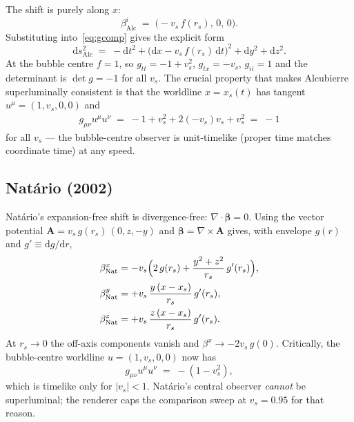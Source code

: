 \documentclass[11pt]{article}
\newcommand{\diff}{\mathrm{d}}
\begin{document}
The shift is purely along $x$:
\begin{equation}
\beta^i_{\text{Alc}} \;=\; \bigl(-v_s\,f(r_s),\,0,\,0\bigr).
\label{eq:alc-shift}
\end{equation}
Substituting into~\eqref{eq:gcomp} gives the explicit form
\begin{equation}
\diff s^2_{\text{Alc}} \;=\; -\diff t^2 + \bigl(\diff x - v_s\,f(r_s)\,\diff t\bigr)^2 + \diff y^2 + \diff z^2.
\label{eq:alc-line}
\end{equation}
At the bubble centre $f=1$, so $g_{tt}=-1+v_s^2$, $g_{tx}=-v_s$, $g_{ii}=1$
and the determinant is $\det g = -1$ for all $v_s$.  The crucial property
that makes Alcubierre superluminally consistent is that the worldline
$x=x_s(t)$ has tangent $u^\mu = (1, v_s, 0, 0)$ and
\begin{align}
g_{\mu\nu} u^\mu u^\nu \;=\; -1 + v_s^2 + 2(-v_s)v_s + v_s^2 \;=\; -1
\end{align}
for all $v_s$ — the bubble-centre observer is unit-timelike (proper time
matches coordinate time) at any speed.

\subsection*{Natário (2002)}

Natário's expansion-free shift is divergence-free: $\nabla\cdot\bm\beta = 0$.
Using the vector potential $\bm A = v_s\,g(r_s)\,(0,z,-y)$ and
$\bm\beta = \nabla\times\bm A$ gives, with envelope $g(r)$ and $g'\equiv\diff g/\diff r$,
\begin{align}
\beta^x_{\text{Nat}} &= -v_s\Bigl(2\,g(r_s) + \frac{y^2+z^2}{r_s}\,g'(r_s)\Bigr), \nonumber\\
\beta^y_{\text{Nat}} &= +v_s\,\frac{y\,(x-x_s)}{r_s}\,g'(r_s),\\
\beta^z_{\text{Nat}} &= +v_s\,\frac{z\,(x-x_s)}{r_s}\,g'(r_s). \nonumber
\label{eq:nat-shift}
\end{align}
At $r_s\!\to\!0$ the off-axis components vanish and
$\beta^x \to -2 v_s\,g(0)$.  Critically, the bubble-centre worldline
$u=(1,v_s,0,0)$ now has
\begin{equation}
g_{\mu\nu}u^\mu u^\nu \;=\; -(1-v_s^2),
\end{equation}
which is timelike only for $|v_s|<1$.  Natário's central observer
\emph{cannot} be superluminal; the renderer caps the comparison sweep at
$v_s = 0.95$ for that reason.
\end{document}
